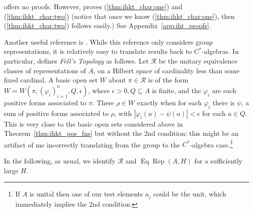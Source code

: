 \documentclass[a4paper,11pt]{article}
\newcommand{\mc}[1]{{\mathcal{#1}}}
\newcommand{\Rep}{\operatorname{Rep}}
\newcommand{\Eq}{\operatorname{Eq}}
\begin{document}
\cite{fell3} offers no proofs.  However, \cite[Lemma~5.7]{kan} proves
(\ref{thm:ihkt_char:one}) and (\ref{thm:ihkt_char:two}) (notice that once we
know (\ref{thm:ihkt_char:one}), then (\ref{thm:ihkt_char:two}) follows easily.)
See Appendix~\ref{app:iht_proofs}.

Another useful reference is \cite[Appendix~F]{bhv}.  While this reference only
considers group representations, it is relatively easy to translate results
back to $C^*$-algebras.  In particular, \cite[Definition~F.2.1]{bhv} defines
\emph{Fell's Topology} as follows.  Let $\mc R$ be the unitary equivalence
classes of representations of $A$, on a Hilbert space
of cardinality less than some fixed cardinal.  A basic open set $W$ about
$\pi\in\mc R$ is of the form $W = W(\pi,(\varphi_i)_{i=1}^n,Q,\epsilon)$,
where $\epsilon>0, Q\subseteq A$ is finite, and the $\varphi_i$ are each
positive forms associated to $\pi$.  There $\rho\in W$ exactly when for each
$\varphi_i$ there is $\psi$, a sum of positive forms associated to $\rho$,
with $|\varphi_i(a) - \psi(a)|<\epsilon$ for each $a\in Q$.  This is very close
to the basic open sets considered above in Theorem~\ref{thm:ihkt_pos_fns}
but without the 2nd condition: this might be an artifact of me incorrectly
translating from the group to the $C^*$-algebra case.\footnote{If $A$ is unital
then one of our test elements $a_j$ could be the unit, which immediately implies
the 2nd condition.}

In the following, as usual, we identify $\mc R$ and $\Eq\Rep(A,H)$ for a
sufficiently large $H$.
\end{document}

